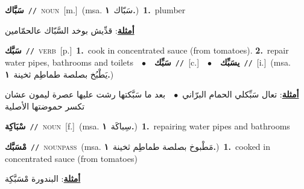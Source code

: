 \documentclass[10pt,a4paper,twoside]{article} %
\begin{document}
\begin{multicols}{2}
{\setlength\topsep{0pt}\textbf{\foreignlanguage{arabic}{سَبَّاك}}\ {\color{gray}\texttt{//}\color{black}}\ \textsc{noun}\ [m.]\ \color{gray}(msa. \foreignlanguage{arabic}{سَبّاك}~\foreignlanguage{arabic}{\textbf{١.}})\color{black}\ \textbf{1.}~plumber\  \begin{flushright}\color{gray}\foreignlanguage{arabic}{\textbf{\underline{\foreignlanguage{arabic}{أمثلة}}}: قدِّيش بوخد السَّبّاك عالحمّامين}\end{flushright}\color{black}} \vspace{2mm}

{\setlength\topsep{0pt}\textbf{\foreignlanguage{arabic}{سَبَّك}}\ {\color{gray}\texttt{//}\color{black}}\ \textsc{verb}\ [p.]\ \textbf{1.}~cook in concentrated sauce (from tomatoes).  \textbf{2.}~repair water pipes, bathrooms and toilets\ \ $\bullet$\ \ \setlength\topsep{0pt}\textbf{\foreignlanguage{arabic}{سَبِّك}}\ {\color{gray}\texttt{//}\color{black}}\ [c.]\ \ $\bullet$\ \ \setlength\topsep{0pt}\textbf{\foreignlanguage{arabic}{يسَبِّك}}\ {\color{gray}\texttt{//}\color{black}}\ [i.]\ \color{gray}(msa. \foreignlanguage{arabic}{يَطْبُخ بصلصة طماطِم ثخينة}~\foreignlanguage{arabic}{\textbf{١.}})\color{black}\  \begin{flushright}\color{gray}\foreignlanguage{arabic}{\textbf{\underline{\foreignlanguage{arabic}{أمثلة}}}: تعال سَبِّكلي الحمام البرّاني\ $\bullet$\ \  بعد ما سَبَّكتها رشت عليها عصرة ليمون عشان تكسر حموضتها الأصلية}\end{flushright}\color{black}} \vspace{2mm}

{\setlength\topsep{0pt}\textbf{\foreignlanguage{arabic}{سْبَاكِة}}\ {\color{gray}\texttt{//}\color{black}}\ \textsc{noun}\ [f.]\ \color{gray}(msa. \foreignlanguage{arabic}{سِباكَة}~\foreignlanguage{arabic}{\textbf{١.}})\color{black}\ \textbf{1.}~repairing water pipes and bathrooms\ } \vspace{2mm}

{\setlength\topsep{0pt}\textbf{\foreignlanguage{arabic}{مْسَبَّك}}\ {\color{gray}\texttt{//}\color{black}}\ \textsc{noun\textunderscore pass}\ \color{gray}(msa. \foreignlanguage{arabic}{مَطْبوخ بصلصة طماطِم ثخينة}~\foreignlanguage{arabic}{\textbf{١.}})\color{black}\ \textbf{1.}~cooked in concentrated sauce (from tomatoes)\  \begin{flushright}\color{gray}\foreignlanguage{arabic}{\textbf{\underline{\foreignlanguage{arabic}{أمثلة}}}: البندورة مْسَبَّكِة}\end{flushright}\color{black}} \vspace{2mm}


\end{multicols}
\end{document}
